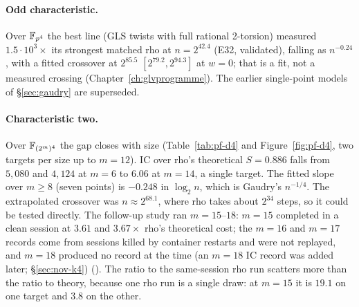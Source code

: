 \paragraph{Odd characteristic.} Over $\mathbb{F}_{p^4}$ the best line (GLS twists
with full rational 2-torsion) measured $1.5\cdot10^3\times$ its strongest
matched rho at $n=2^{42.4}$ (E32, validated), falling as $n^{-0.24}$, with a
fitted crossover at $2^{85.5}$ $[2^{79.2},2^{94.3}]$ at $w=0$; that is a fit,
not a measured crossing (Chapter~\ref{ch:glvprogramme}). The earlier
single-point models of \S\ref{sec:gaudry} are superseded.

\paragraph{Characteristic two.} Over $\mathbb{F}_{(2^m)^4}$ the gap closes with
size (Table~\ref{tab:pf-d4} and Figure~\ref{fig:pf-d4}, two targets per
size up to $m=12$). IC over rho's theoretical $S=0.886$ falls from
$5{,}080$ and $4{,}124$ at $m=6$ to $6.06$ at $m=14$, a single target. The
fitted slope over $m\ge8$ (seven points) is $-0.248$ in $\log_2 n$, which
is Gaudry's $n^{-1/4}$. The extrapolated crossover was $n\approx2^{68.1}$,
where rho takes about $2^{34}$ steps, so it could be tested directly. The
follow-up study ran $m=15$--$18$: $m=15$ completed in a clean session at
$3.61$ and $3.67\times$ rho's theoretical cost; the $m=16$ and $m=17$
records come from sessions killed by container restarts and were not
replayed, and $m=18$ produced no record at the time (an $m=18$ IC record was added later; \S\ref{sec:nov-k4})
(). The ratio to
the same-session rho run scatters more than the ratio to theory, because
one rho run is a single draw: at $m=15$ it is $19.1$ on one target and
$3.8$ on the other.

